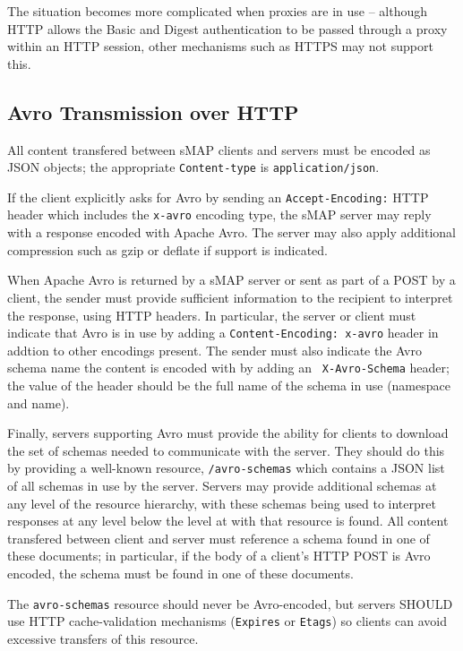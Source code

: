 \documentclass[10pt,letterpaper]{article}
\newcommand{\smap}{sMAP}
\begin{document}
The situation becomes more complicated when proxies are in use -- although
HTTP allows the Basic and Digest authentication to be passed through a proxy
within an HTTP session, other mechanisms such as HTTPS may not support this.

\subsection{Avro Transmission over HTTP}
All content transfered between \smap{} clients and servers must be encoded as
JSON objects; the appropriate {\tt Content-type} is {\tt application/json}.

If the client explicitly asks for Avro by sending an {\tt Accept-Encoding:}
HTTP header which includes the {\tt x-avro} encoding type, the \smap{} server
may reply with a response encoded with Apache Avro.  The server may also apply
additional compression such as gzip or deflate if support is indicated.

When Apache Avro is returned by a \smap{} server or sent as part of a POST by
a client, the sender must provide sufficient information to the recipient to
interpret the response, using HTTP headers.  In particular, the server or
client must indicate that Avro is in use by adding a {\tt Content-Encoding:
  x-avro} header in addtion to other encodings present.  The sender must also
indicate the Avro schema name the content is encoded with by adding an {\tt
  X-Avro-Schema} header; the value of the header should be the full name of
the schema in use (namespace and name).

Finally, servers supporting Avro must provide the ability for clients to
download the set of schemas needed to communicate with the server.  They
should do this by providing a well-known resource, {\tt /avro-schemas} which
contains a JSON list of all schemas in use by the server.  Servers may provide
additional schemas at any level of the resource hierarchy, with these schemas
being used to interpret responses at any level below the level at with that
resource is found.  All content transfered between client and server must
reference a schema found in one of these documents; in particular, if the body
of a client's HTTP POST is Avro encoded, the schema must be found in one of
these documents.

The {\tt avro-schemas} resource should never be Avro-encoded, but servers
SHOULD use HTTP cache-validation mechanisms ({\tt Expires} or {\tt Etags}) so
clients can avoid excessive transfers of this resource.
\end{document}
